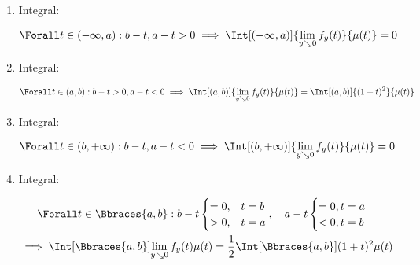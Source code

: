 \begin{solution}
\begin{enumerate}[label = \arabic*.]

    \item Integral:
    
    \begin{align*}
        \Forall t \in (-\infty, a):
        b - t, a - t > 0
        \implies
        \Int[(-\infty, a)]
        {
            \lim_{y \searrow 0}
            f_y(t)
        }{\mu(t)}
        =
        0            
    \end{align*}

    \item Integral:
    
    \begin{align*}
        \Forall t \in (a, b):
        b - t > 0,
        a - t < 0
        \implies
        \Int[(a, b)]
        {
            \lim_{y \searrow 0}
            f_y(t)
        }{\mu(t)}
        =
        \Int[(a, b)]
        {
            (1 + t)^2
        }{\mu(t)}        
    \end{align*}

    \item Integral:
    
    \begin{align*}
        \Forall t \in (b, +\infty):
        b - t, a - t < 0
        \implies
        \Int[(b, +\infty)]
        {
            \lim_{y \searrow 0}
            f_y(t)
        }{\mu(t)}
        =
        0            
    \end{align*}

    \item Integral:

    \begin{multline*}
        \Forall t \in \Bbraces{a, b}:
        b - t
        \begin{cases}
            = 0, & t = b \\
            > 0, & t = a
        \end{cases},
        \quad
        a - t
        \begin{cases}
            = 0, t = a \\
            < 0, t = b
        \end{cases} \\
        \implies
        \Int[\Bbraces{a, b}]
        {
            \lim_{y \searrow 0}
            f_y(t)
        }{\mu(t)}
        =
        \frac{1}{2}
        \Int[\Bbraces{a, b}]{(1 + t)^2}{\mu(t)}
    \end{multline*}

\end{enumerate}

\end{solution}

